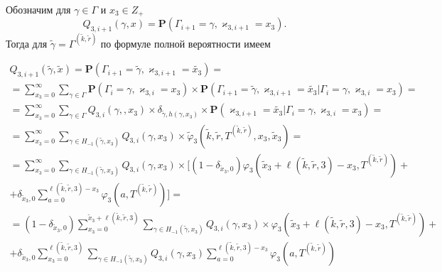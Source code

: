 \documentclass[a4paper,12pt,russian]{extarticle}
\renewcommand{\Pr}{{\mathbf P}}
\begin{document}
Обозначим для $\gamma \in \Gamma$ и $x_3 \in Z_+$
\begin{equation}
Q_{3,i+1}(\gamma,x) = \Pr(\Gamma_{i+1}=\gamma, \varkappa_{3,i+1}=x_3).
\end{equation}
Тогда для $\tilde{\gamma} =\Gamma^{(\tilde{k},\tilde{r})}$ по формуле полной вероятности имеем

\begin{multline*}
Q_{3,i+1}(\tilde{\gamma},\tilde{x}) = \Pr(\Gamma_{i+1}=\tilde{\gamma}, \varkappa_{3,i+1}=\tilde{x_3}) = \\
= \sum_{x_3=0}^{\infty}\sum_{\gamma \in \Gamma} \Pr(\Gamma_{i}=\gamma, \varkappa_{3,i}=x_3) \times \Pr(\Gamma_{i+1}=\tilde{\gamma}, \varkappa_{3,i+1}=\tilde{x_3} | \Gamma_{i}=\gamma, \varkappa_{3,i}=x_3) =  \\ 
= \sum_{x_3=0}^{\infty}\sum_{\gamma \in \Gamma} Q_{3,i}(\gamma,,x_3) \times \delta_{\tilde{\gamma},h(\gamma,x_3)}\times
\Pr(\varkappa_{3,i+1}=\tilde{x_3} | \Gamma_{i}=\gamma, \varkappa_{3,i}=x_3)= \\
= \sum_{x_3=0}^{\infty}\sum_{\gamma \in H_{-1}(\tilde{\gamma},x_3)} Q_{3,i}(\gamma,x_3) \times 
\tilde{\varphi}_3(\tilde{k},\tilde{r}, T^{(\tilde{k},\tilde{r})},x_3,\tilde{x}_3) = \\
= \sum_{x_3=0}^{\infty}\sum_{\gamma \in H_{-1}(\tilde{\gamma},x_3)} Q_{3,i}(\gamma,x_3) \times 
[ (1-\delta_{\tilde{x}_3,0})\varphi_3(\tilde{x}_3 + \ell(\tilde{k},\tilde{r},3) - x_3,T^{(\tilde{k},\tilde{r})}) + \\ 
+\delta_{\tilde{x}_3,0} \sum_{a=0}^{\ell(\tilde{k},\tilde{r},3)-x_3}\varphi_3(a,T^{(\tilde{k},\tilde{r})})]= \\
= (1-\delta_{\tilde{x}_3,0}) \sum_{x_3=0}^{\tilde{x}_3 +  \ell(\tilde{k},\tilde{r},3)}\sum_{\gamma \in H_{-1}(\tilde{\gamma},x_3)} Q_{3,i}(\gamma,x_3) \times 
\varphi_3(\tilde{x}_3 + \ell(\tilde{k},\tilde{r},3) - x_3,T^{(\tilde{k},\tilde{r})}) + \\
+ \delta_{\tilde{x}_3,0} \sum_{x_3=0}^{\ell(\tilde{k},\tilde{r},3)}\sum_{\gamma \in H_{-1}(\tilde{\gamma},x_3)} Q_{3,i}(\gamma,x_3) \sum_{a=0}^{\ell(\tilde{k},\tilde{r},3) - x_3} \varphi_3(a,T^{(\tilde{k},\tilde{r})})
\end{multline*}
\end{document}
